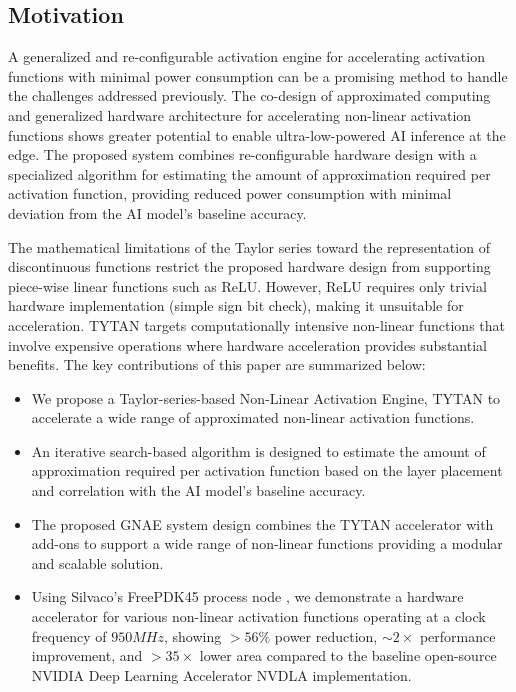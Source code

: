 \documentclass[runningheads]{llncs}
\begin{document}
\subsection{Motivation}
    A generalized and re-configurable activation engine for accelerating activation functions with minimal power consumption can be a promising method to handle the challenges addressed previously. The co-design of approximated computing and generalized hardware architecture for accelerating non-linear activation functions shows greater potential to enable ultra-low-powered AI inference at the edge. The proposed system combines re-configurable hardware design with a specialized algorithm for estimating the amount of approximation required per activation function, providing reduced power consumption with minimal deviation from the AI model's baseline accuracy.
    
    The mathematical limitations of the Taylor series toward the representation of discontinuous functions restrict the proposed hardware design from supporting piece-wise linear functions such as ReLU. However, ReLU requires only trivial hardware implementation (simple sign bit check), making it unsuitable for acceleration. TYTAN targets computationally intensive non-linear functions that involve expensive operations where hardware acceleration provides substantial benefits. The key contributions of this paper are summarized below:
    
    \begin{itemize}
      \item We propose a Taylor-series-based Non-Linear Activation Engine, TYTAN to accelerate a wide range of approximated non-linear activation functions. 
      \item An iterative search-based algorithm is designed to estimate the amount of approximation required per activation function based on the layer placement and correlation with the AI model's baseline accuracy.
      \item The proposed GNAE system design combines the TYTAN accelerator with add-ons to support a wide range of non-linear functions providing a modular and scalable solution. 
      \item Using Silvaco's FreePDK45 process node \cite{opencell_freepdk}, we demonstrate a hardware accelerator for various non-linear activation functions operating at a clock frequency of $950MHz$, showing $>56\%$ power reduction, $\sim 2\times$ performance improvement, and $>35\times$ lower area compared to the baseline open-source NVIDIA Deep Learning Accelerator NVDLA \cite{NVDLA} implementation.
    \end{itemize}
\end{document}
